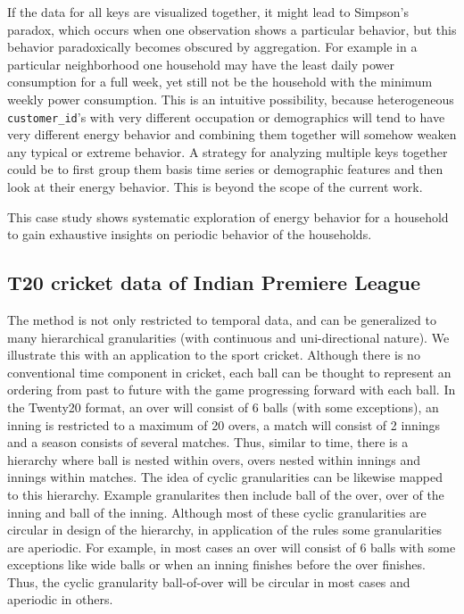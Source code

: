 \documentclass[
]{article}
\begin{document}
If the data for all keys are visualized together, it might lead to Simpson's paradox, which occurs when one observation shows a particular behavior, but this behavior paradoxically becomes obscured by aggregation. For example in a particular neighborhood one household may have the least daily power consumption for a full week, yet still not be the household with the minimum weekly power consumption. This is an intuitive possibility, because heterogeneous \texttt{customer\_id}'s with very different occupation or demographics will tend to have very different energy behavior and combining them together will somehow weaken any typical or extreme behavior. A strategy for analyzing multiple keys together could be to first group them basis time series or demographic features and then look at their energy behavior. This is beyond the scope of the current work.

This case study shows systematic exploration of energy behavior for a household to gain exhaustive insights on periodic behavior of the households.

\hypertarget{sec:cricket}{%
\subsection{T20 cricket data of Indian Premiere League}\label{sec:cricket}}

The method is not only restricted to temporal data, and can be generalized to many hierarchical granularities (with continuous and uni-directional nature). We illustrate this with an application to the sport cricket. Although there is no conventional time component in cricket, each ball can be thought to represent an ordering from past to future with the game progressing forward with each ball. In the Twenty20 format, an over will consist of 6 balls (with some exceptions), an inning is restricted to a maximum of 20 overs, a match will consist of 2 innings and a season consists of several matches. Thus, similar to time, there is a hierarchy where ball is nested within overs, overs nested within innings and innings within matches. The idea of cyclic granularities can be likewise mapped to this hierarchy. Example granularites then include ball of the over, over of the inning and ball of the inning. Although most of these cyclic granularities are circular in design of the hierarchy, in application of the rules some granularities are aperiodic. For example, in most cases an over will consist of 6 balls with some exceptions like wide balls or when an inning finishes before the over finishes. Thus, the cyclic granularity ball-of-over will be circular in most cases and aperiodic in others.
\end{document}
